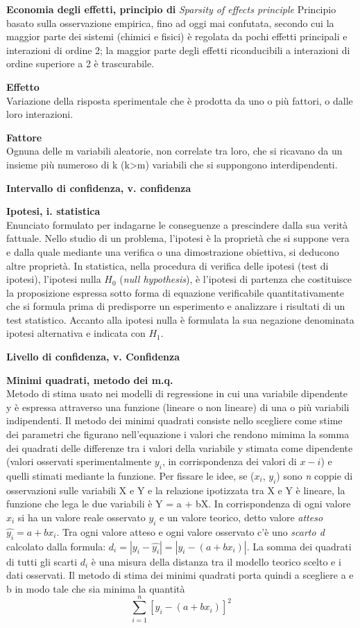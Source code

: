 \documentclass[
  11pt,
]{book}
\begin{document}
\textbf{Economia degli effetti, principio di} \emph{Sparsity of effects principle} Principio basato sulla osservazione empirica, fino ad oggi mai confutata, secondo cui la maggior parte dei sistemi (chimici e fisici) è regolata da pochi effetti principali e interazioni di ordine 2; la maggior parte degli effetti riconducibili a interazioni di ordine superiore a 2 è trascurabile.
\citep{lietal.2006}\citep{bergquistetal.2011}

\textbf{Effetto}\\
Variazione della risposta sperimentale che è prodotta da uno o più fattori, o dalle loro interazioni.

\textbf{Fattore}\\
Ognuna delle m variabili aleatorie, non correlate tra loro, che si ricavano da un insieme più numeroso di k (k\textgreater m) variabili che si suppongono interdipendenti.

\textbf{Intervallo di confidenza, v. confidenza}

\textbf{Ipotesi, i. statistica}\\
Enunciato formulato per indagarne le conseguenze a prescindere dalla sua verità fattuale.
Nello studio di un problema, l'ipotesi è la proprietà che si suppone vera e dalla quale mediante una verifica o una dimostrazione obiettiva, si deducono altre proprietà.
In statistica, nella procedura di verifica delle ipotesi (test di ipotesi), l'ipotesi nulla \(H_0\) (\emph{null hypothesis}), è l'ipotesi di partenza che costituisce la proposizione espressa sotto forma di equazione verificabile quantitativamente che si formula prima di predisporre un esperimento e analizzare i risultati di un test statistico.
Accanto alla ipotesi nulla è formulata la sua negazione denominata ipotesi alternativa e indicata con \(H_1\).

\textbf{Livello di confidenza, v. Confidenza}

\textbf{Minimi quadrati, metodo dei m.q.}\\
Metodo di stima usato nei modelli di regressione in cui una variabile dipendente y è espressa attraverso una funzione (lineare o non lineare) di una o più variabili indipendenti.
Il metodo dei minimi quadrati consiste nello scegliere come stime dei parametri che figurano nell'equazione i valori che rendono mimima la somma dei quadrati delle differenze tra i valori della variabile y stimata come dipendente (valori osservati sperimentalmente \(y_i\), in corrispondenza dei valori di \(x-i\)) e quelli stimati mediante la funzione.
Per fissare le idee, se (\(x_i\), \(y_i\)) sono \emph{n} coppie di osservazioni sulle variabili X e Y e la relazione ipotizzata tra X e Y è lineare, la funzione che lega le due variabili è Y = a + bX.
In corrispondenza di ogni valore \(x_i\) si ha un valore reale osservato \(y_i\) e un valore teorico, detto valore \emph{atteso} \(\hat{y_i} = a + bx_i\).
Tra ogni valore atteso e ogni valore osservato c'è uno \emph{scarto d} calcolato dalla formula: \(d_i=|y_i-\hat{y_i}| =|y_i-(a + bx_i)|\).
La somma dei quadrati di tutti gli scarti \(d_i\) è una misura della distanza tra il modello teorico scelto e i dati osservati.
Il metodo di stima dei minimi quadrati porta quindi a scegliere a e b in modo tale che sia minima la quantità \[\sum_{i=1}^{n} [y_i-(a+bx_i)]^2\]
\end{document}

